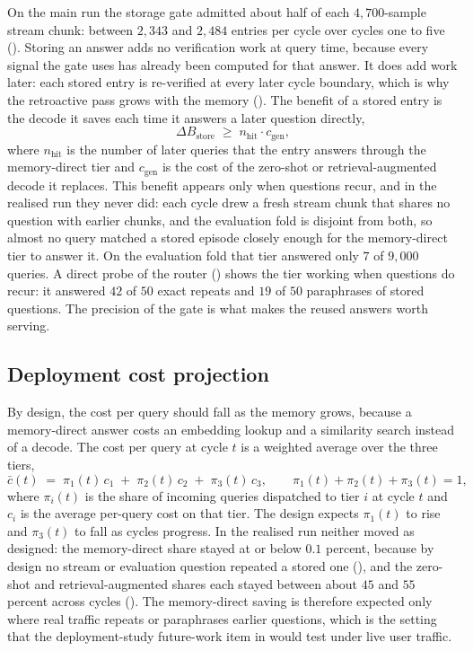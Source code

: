 On the main run the storage gate admitted about half of each $4{,}700$-sample stream chunk: between $2{,}343$ and $2{,}484$ entries per cycle over cycles one to five (). Storing an answer adds no verification work at query time, because every signal the gate uses has already been computed for that answer. It does add work later: each stored entry is re-verified at every later cycle boundary, which is why the retroactive pass grows with the memory (). The benefit of a stored entry is the decode it saves each time it answers a later question directly,
\begin{equation}
\Delta B_{\text{store}} \;\ge\; n_{\text{hit}} \cdot c_{\text{gen}},
\label{eq:storage-cost-benefit}
\end{equation}
where $n_{\text{hit}}$ is the number of later queries that the entry answers through the memory-direct tier and $c_{\text{gen}}$ is the cost of the zero-shot or retrieval-augmented decode it replaces. This benefit appears only when questions recur, and in the realised run they never did: each cycle drew a fresh stream chunk that shares no question with earlier chunks, and the evaluation fold is disjoint from both, so almost no query matched a stored episode closely enough for the memory-direct tier to answer it. On the evaluation fold that tier answered only $7$ of $9{,}000$ queries. A direct probe of the router () shows the tier working when questions do recur: it answered $42$ of $50$ exact repeats and $19$ of $50$ paraphrases of stored questions. The precision of the gate is what makes the reused answers worth serving.

\subsection{Deployment cost projection}
\label{sec:econ-deployment}

By design, the cost per query should fall as the memory grows, because a memory-direct answer costs an embedding lookup and a similarity search instead of a decode. The cost per query at cycle $t$ is a weighted average over the three tiers,
\begin{equation}
\bar{c}(t) \;=\; \pi_{1}(t)\, c_{1} \;+\; \pi_{2}(t)\, c_{2} \;+\; \pi_{3}(t)\, c_{3},
\qquad \pi_{1}(t) + \pi_{2}(t) + \pi_{3}(t) = 1,
\label{eq:deployment-cost}
\end{equation}
where $\pi_{i}(t)$ is the share of incoming queries dispatched to tier $i$ at cycle $t$ and $c_{i}$ is the average per-query cost on that tier. The design expects $\pi_{1}(t)$ to rise and $\pi_{3}(t)$ to fall as cycles progress. In the realised run neither moved as designed: the memory-direct share stayed at or below $0.1$ percent, because by design no stream or evaluation question repeated a stored one (), and the zero-shot and retrieval-augmented shares each stayed between about $45$ and $55$ percent across cycles (). The memory-direct saving is therefore expected only where real traffic repeats or paraphrases earlier questions, which is the setting that the deployment-study future-work item in  would test under live user traffic.

